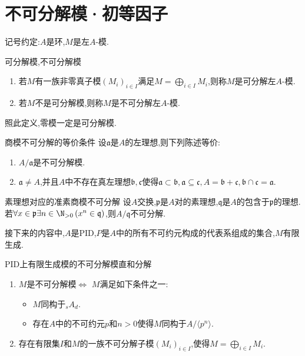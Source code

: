 \section{不可分解模·初等因子}

记号约定:$A$是环,$M$是左$A$-模.

\begin{definition}{可分解模,不可分解模}{}
	\begin{enumerate}
		\item 若$M$有一族非零真子模$\left(M_{i}\right)_{i\in I}$满足$M=\bigoplus\limits_{i\in I}M_{i}$,则称$M$是可分解左$A$-模.
		\item 若$M$不是可分解模,则称$M$是不可分解左$A$-模.
	\end{enumerate}
\end{definition}

\begin{remark}{}{}
	照此定义,零模一定是可分解模.
\end{remark}

\begin{lemma}{商模不可分解的等价条件}{}
	设$\mathfrak{a}$是$A$的左理想,则下列陈述等价:
	\begin{enumerate}
		\item $A/\mathfrak{a}$是不可分解模.
		\item $\mathfrak{a}\neq A$,并且$A$中不存在真左理想$\mathfrak{b},\mathfrak{c}$使得$\mathfrak{a}\subset\mathfrak{b},\mathfrak{a}\subseteq\mathfrak{c},A=\mathfrak{b}+\mathfrak{c},\mathfrak{b}\cap\mathfrak{c}=\mathfrak{a}$.
	\end{enumerate}
\end{lemma}

\begin{proposition}{素理想对应的准素商模不可分解}{}
	设$A$交换,$\mathfrak{p}$是$A$对的素理想,$\mathfrak{q}$是$A$的包含于$\mathfrak{p}$的理想.若$\forall x\in\mathfrak{p}\exists n\in\N_{>0}\left(x^{n}\in\mathfrak{q}\right)$,则$A/\mathfrak{q}$不可分解.
\end{proposition}

接下来的内容中,$A$是PID,$P$是$A$中的所有不可约元构成的代表系组成的集合,$M$有限生成.

\begin{proposition}{PID上有限生成模的不可分解模直和分解}{}
	\begin{enumerate}
		\item $M$是不可分解模$\iff$ $M$满足如下条件之一:
		\begin{itemize}
			\item $M$同构于$_{s}A_{d}$.
			\item 存在$A$中的不可约元$p$和$n>0$使得$M$同构于$A/\langle p^{n}\rangle$.
		\end{itemize}
		\item 存在有限集$I$和$M$的一族不可分解子模$\left(M_{i}\right)_{i\in I}$,使得$M=\bigoplus\limits_{i\in I}M_{i}$.
	\end{enumerate}
\end{proposition}


